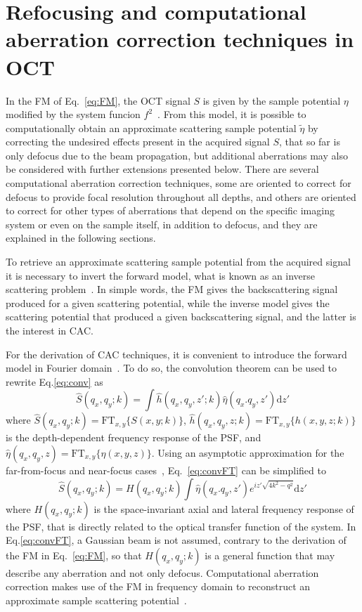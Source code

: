 \section{Refocusing and computational aberration correction techniques in OCT}\label{CAC}

In the FM of Eq.~\ref{eq:FM}, the OCT signal $S$ is given by the sample potential $\eta$ modified by the system funcion $f^2$~\cite{Marks2006_Inverse}. From this model, it is possible to computationally obtain an approximate scattering sample potential $\tilde{\eta}$ by correcting the undesired effects present in the acquired signal $S$, that so far is only defocus due to the beam propagation, but additional aberrations may also be considered with further extensions presented below. There are several computational aberration correction techniques, some are oriented to correct for defocus to provide focal resolution throughout all depths, and others are oriented to correct for other types of aberrations that depend on the specific imaging system or even on the sample itself, in addition to defocus, and they are explained in the following sections.

To retrieve an approximate scattering sample potential from the acquired signal it is necessary to invert the forward model, what is known as an inverse scattering problem~\cite{Ralston2006_Interferometric}. In simple words, the FM gives the backscattering signal produced for a given scattering potential, while the inverse model gives the scattering potential that produced a given backscattering signal, and the latter is the interest in CAC.

For the derivation of CAC techniques, it is convenient to introduce the forward model in Fourier domain~\cite{Liu2017_Computational}. To do so, the convolution theorem can be used to rewrite Eq.\eqref{eq:conv} as
\begin{equation}\label{eq:convFT}
    \hat{S}(q_x, q_y; k) = \int \hat{h}(q_x, q_y, z'; k) \hat{\eta}(q_x. q_y, z') \text{d}z'
\end{equation}
where $\hat{S}(q_x, q_y; k)=\text{FT}_{x,y}\{S(x,y;k)\}$, $\hat{h}(q_x, q_y, z; k)=\text{FT}_{x,y}\{h(x,y,z;k)\}$ is the depth-dependent frequency response of the PSF, and $\hat{\eta}(q_x, q_y, z)=\text{FT}_{x,y}\{\eta(x,y,z)\}$. Using an asymptotic approximation for the far-from-focus and near-focus cases~\cite{Davis2007_Nonparaxial}, Eq.~\eqref{eq:convFT} can be simplified to
\begin{equation}\label{eq:FMft}
    \hat{S}(q_x, q_y; k) = H(q_x, q_y; k) \int \hat{\eta}(q_x. q_y, z') e^{iz'\sqrt{4k^2-q^2}} \text{d}z'
\end{equation}
where $H(q_x, q_y; k)$ is the space-invariant axial and lateral frequency response of the PSF, that is directly related to the optical transfer function of the system. In Eq.\eqref{eq:convFT}, a Gaussian beam is not assumed, contrary to the derivation of the FM in Eq.~\eqref{eq:FM}, so that $H(q_x, q_y; k)$ is a general function that may describe any aberration and not only defocus. Computational aberration correction makes use of the FM in frequency domain to reconstruct an approximate sample scattering potential~\cite{Liu2017_Computational}.

